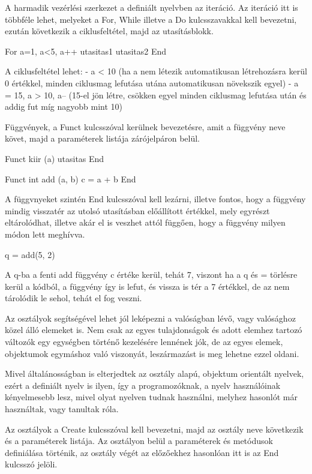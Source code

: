 A harmadik vezérlési szerkezet a definiált nyelvben az iteráció. Az iteráció itt is többféle lehet, melyeket a For, While illetve a Do kulcsszavakkal kell bevezetni, ezután következik a ciklusfeltétel, majd az utasításblokk.

\begin{cpp}
For a=1, a<5, a++
	utasitas1
	utasitas2
End
\end{cpp}

A ciklusfeltétel lehet:
- a < 10 (ha a nem létezik automatikusan létrehozásra kerül 0 értékkel, minden ciklusmag lefutása utána automatikusan növekszik egyel)
- a = 15, a > 10, a-- (15-el jön létre, csökken egyel minden ciklusmag lefutása után és addig fut míg nagyobb mint 10)

Függvények, a Funct kulcsszóval kerülnek bevezetésre, amit a függvény neve követ, majd a paraméterek listája zárójelpáron belül.

\begin{cpp}
Funct kiir (a)
	utasitas
End

Funct int add (a, b)
	c = a + b
End
\end{cpp}

A függvnyeket szintén End kulcsszóval kell lezárni, illetve fontos, hogy a függvény mindig visszatér az utolsó utasításban előállított értékkel, mely egyrészt eltárolódhat, illetve akár el is veszhet attól függően, hogy a függvény milyen módon lett meghívva.

\begin{cpp}
q = add(5, 2)
\end{cpp}

A q-ba a fenti add függvény c értéke kerül, tehát 7, viszont ha a q és = törlésre kerül a kódból, a függvény így is lefut, és vissza is tér a 7 értékkel, de az nem tárolódik le sehol, tehát el fog veszni.

Az osztályok segítségével lehet jól leképezni a valóságban lévő, vagy valósághoz közel álló elemeket is. Nem csak az egyes tulajdonságok és adott elemhez tartozó változók egy egységben történő kezelésére lennének jók, de az egyes elemek, objektumok egymáshoz való viszonyát, leszármazást is meg lehetne ezzel oldani.

Mivel általánosságban is elterjedtek az osztály alapú, objektum orientált nyelvek, ezért a definiált nyelv is ilyen, így a programozóknak, a nyelv használóinak kényelmesebb lesz, mivel olyat nyelven tudnak használni, melyhez hasonlót már használtak, vagy tanultak róla.

Az osztályok a Create kulcsszóval kell bevezetni, majd az osztály neve következik és a paraméterek listája. Az osztályon belül a paraméterek és metódusok definiálása történik, az osztály végét az előzőekhez hasonlóan itt is az End kulcsszó jelöli.


